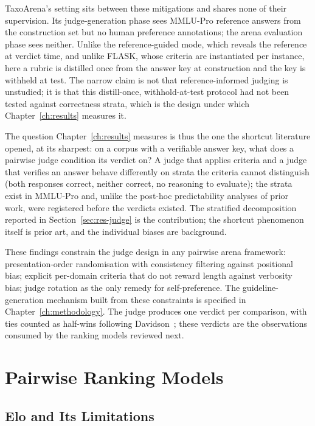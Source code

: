 TaxoArena's setting sits between these mitigations and shares none of
their supervision. Its judge-generation phase sees MMLU-Pro reference
answers from the construction set but no human preference
annotations; the arena evaluation phase sees neither. Unlike the
reference-guided mode, which reveals the reference at verdict time,
and unlike FLASK, whose criteria are instantiated per instance, here
a rubric is distilled once from the answer key at construction and
the key is withheld at test. The narrow claim is not that
reference-informed judging is unstudied; it is that this
distill-once, withhold-at-test protocol had not been tested against
correctness strata, which is the design under which
Chapter~\ref{ch:results} measures it.

The question Chapter~\ref{ch:results} measures is thus the one the
shortcut literature opened, at its sharpest: on a corpus with a
verifiable answer key, what does a pairwise judge condition its
verdict on? A judge that applies criteria and a judge that verifies
an answer behave differently on strata the criteria cannot
distinguish (both responses correct, neither correct, no reasoning to
evaluate); the strata exist in MMLU-Pro and, unlike the post-hoc
predictability analyses of prior work, were registered before the
verdicts existed. The stratified decomposition reported in
Section~\ref{sec:res-judge} is the contribution; the shortcut
phenomenon itself is prior art, and the individual biases are
background.

\bigskip
\noindent
These findings constrain the judge design in any pairwise arena
framework: presentation-order randomisation with consistency
filtering against positional bias; explicit per-domain criteria that
do not reward length against verbosity bias; judge rotation as the
only remedy for self-preference. The guideline-generation mechanism
built from these constraints is specified in
Chapter~\ref{ch:methodology}. The judge produces one verdict
per comparison, with ties counted as half-wins following
Davidson~\parencite{davidson1970ties}; these verdicts are the
observations consumed by the ranking models reviewed next.


\section{Pairwise Ranking Models}\label{sec:ranking-models}

\subsection*{Elo and Its Limitations}

